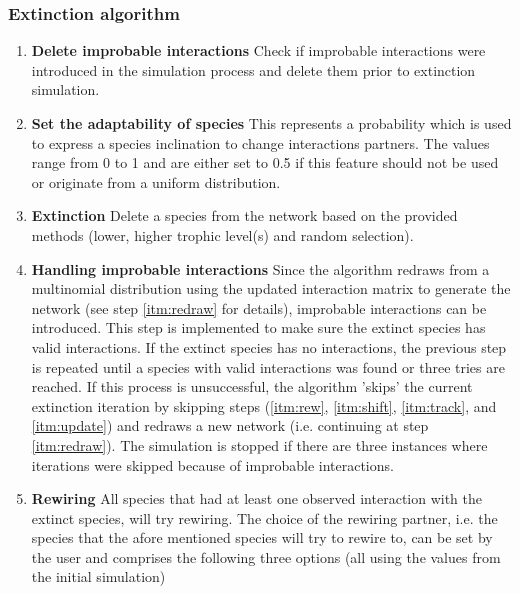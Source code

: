 \documentclass[12pt,a4paper]{article}
\begin{document}
\subsubsection{Extinction algorithm} \label{subsec:extc_alg}
\begin{enumerate} 
	\item \textbf{Delete improbable interactions} {\small Check if improbable interactions were introduced in the simulation process and delete them prior to extinction simulation.}
	\item \textbf{Set the adaptability of species} {\small This represents a probability which is used to express a species inclination to change interactions partners. The values range from 0 to 1 and are either set to 0.5 if this feature should not be used or originate from a uniform distribution.}
	\item \label{itm:etxc} \textbf{Extinction} {\small Delete a species from the network based on the provided methods (lower, higher trophic level(s) and random selection).}
	\item \label{itm:failsafe} \textbf{Handling improbable interactions} {\small Since the algorithm redraws from a multinomial distribution using the updated interaction matrix to generate the network (see step \ref{itm:redraw} for details), improbable interactions can be introduced. This step is implemented to make sure the extinct species has valid interactions. If the extinct species has no interactions, the previous step is repeated until a species with valid interactions was found or three tries are reached. If this process is unsuccessful, the algorithm 'skips' the current extinction iteration by skipping steps (\ref{itm:rew}, \ref{itm:shift}, \ref{itm:track}, and \ref{itm:update}) and redraws a new network (i.e. continuing at step \ref{itm:redraw}). The simulation is stopped if there are three instances where iterations were skipped because of improbable interactions.}
	\item \label{itm:rew} \textbf{Rewiring} {\small All species that had at least one observed interaction with the extinct species, will try rewiring. The choice of the rewiring partner, i.e. the species that the afore mentioned species will try to rewire to, can be set by the user and comprises the following three options (all using the values from the initial simulation)}
		\begin{itemize}

\end{itemize}
\end{enumerate}
\end{document}
